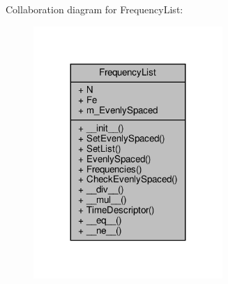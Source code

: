 Collaboration diagram for Frequency\+List\+:\nopagebreak
\begin{figure}[H]
\begin{center}
\leavevmode
\includegraphics[width=203pt]{classSignalIntegrity_1_1FrequencyDomain_1_1FrequencyList_1_1FrequencyList__coll__graph}
\end{center}
\end{figure}
